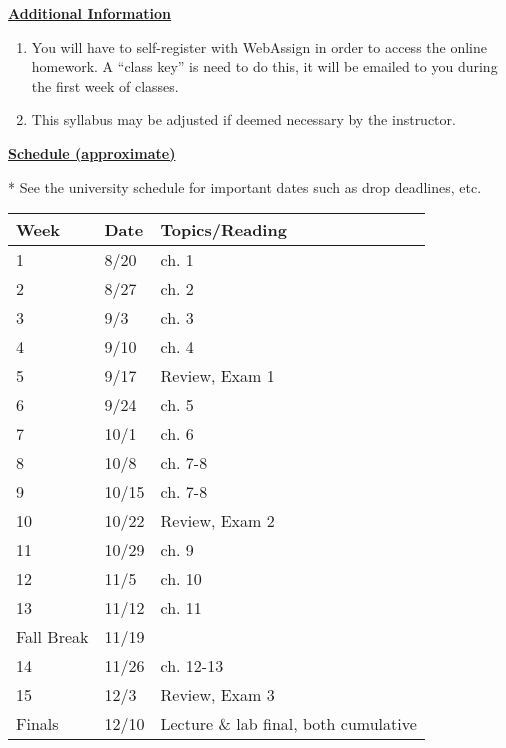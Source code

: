 \documentclass[12pt]{article}
\begin{document}
\underline{\textbf{Additional Information}} \par
\begin{enumerate}
\item You will have to self-register with WebAssign in order to access the online homework.
A “class key” is need to do this, it will be emailed to you during the first week of classes.
\item This syllabus may be adjusted if deemed necessary by the instructor.
\end{enumerate}

\pagebreak

\underline{\textbf{Schedule (approximate)}} \par
* See the university schedule for important dates such as drop deadlines, etc.
\begin{longtable}{| p{} | p{} | p{} |}
\hline
Week & Date & Topics/Reading \\ \hline
1 & 8/20 & ch. 1 \\ \hline
2 & 8/27 & ch. 2 \\ \hline
3 & 9/3 & ch. 3 \\ \hline
4 & 9/10 & ch. 4 \\ \hline
5 & 9/17 & Review, Exam 1 \\ \hline
6 & 9/24 & ch. 5 \\ \hline
7 & 10/1 & ch. 6 \\ \hline
8 & 10/8 & ch. 7-8 \\ \hline
9 & 10/15 & ch. 7-8 \\ \hline
10 & 10/22 & Review, Exam 2 \\ \hline
11 & 10/29 & ch. 9 \\ \hline
12 & 11/5 & ch. 10 \\ \hline
13 & 11/12 & ch. 11 \\ \hline
Fall Break & 11/19 &   \\ \hline
14 & 11/26 & ch. 12-13 \\ \hline
15 & 12/3 & Review, Exam 3 \\ \hline
Finals & 12/10 & Lecture \& lab final, both cumulative \\ \hline
\end{longtable}
\end{document}
